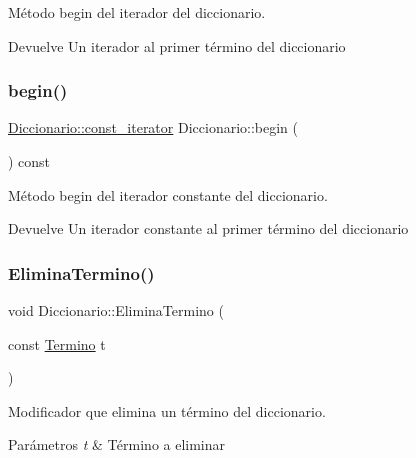 Método begin del iterador del diccionario. 

\begin{DoxyReturn}{Devuelve}
Un iterador al primer término del diccionario 
\end{DoxyReturn}
\mbox{\label{classDiccionario_a5196245f1d267b0ddb9350dfa8f33b2c}} 
\subsubsection{\texorpdfstring{begin()}{begin()}\hspace{0.1cm}{\footnotesize\ttfamily [2/2]}}
{\footnotesize\ttfamily \hyperlink{classDiccionario_a2e86a5840e62eab4f1499c2f23561cba}{Diccionario\+::const\+\_\+iterator} Diccionario\+::begin (\begin{DoxyParamCaption}{ }\end{DoxyParamCaption}) const}



Método begin del iterador constante del diccionario. 

\begin{DoxyReturn}{Devuelve}
Un iterador constante al primer término del diccionario 
\end{DoxyReturn}
\mbox{\label{classDiccionario_a78522832460a1949dcf60e902b5cd950}} 
\subsubsection{\texorpdfstring{Elimina\+Termino()}{EliminaTermino()}}
{\footnotesize\ttfamily void Diccionario\+::\+Elimina\+Termino (\begin{DoxyParamCaption}\item[{const \hyperlink{classTermino}{Termino}}]{t }\end{DoxyParamCaption})}



Modificador que elimina un término del diccionario. 


\begin{DoxyParams}{Parámetros}
{\em t} & Término a eliminar \\
\hline
\end{DoxyParams}
\mbox{\label{classDiccionario_a7de585de002dfdec241b645bc57a3d0a}} 
